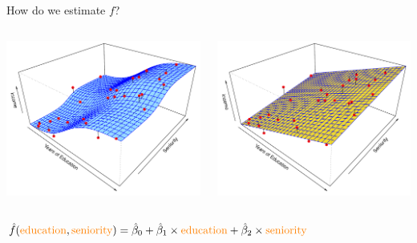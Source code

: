 \documentclass[14pt]{beamer}
\begin{document}
\begin{frame}{How do we estimate $f$?}
\vspace{.5cm}

  \begin{columns}
    \begin{column}{0.5\textwidth}
      \centering
      \includegraphics[width = \textwidth]{2-3.pdf}
    \end{column}
    \begin{column}{0.5\textwidth}
      \centering
      \includegraphics[width = \textwidth]{2-4.pdf}
    \end{column}
  \end{columns}
  
  \vspace{.5cm}
  {\small $ \hat f(\text{\textcolor{orange}{education}}, \text{\textcolor{orange}{seniority}}) = \hat \beta_0 + \hat \beta_1 \times \text{\textcolor{orange}{education}} + \hat \beta_2 \times \text{\textcolor{orange}{seniority}} $}
\end{frame}
\end{document}
